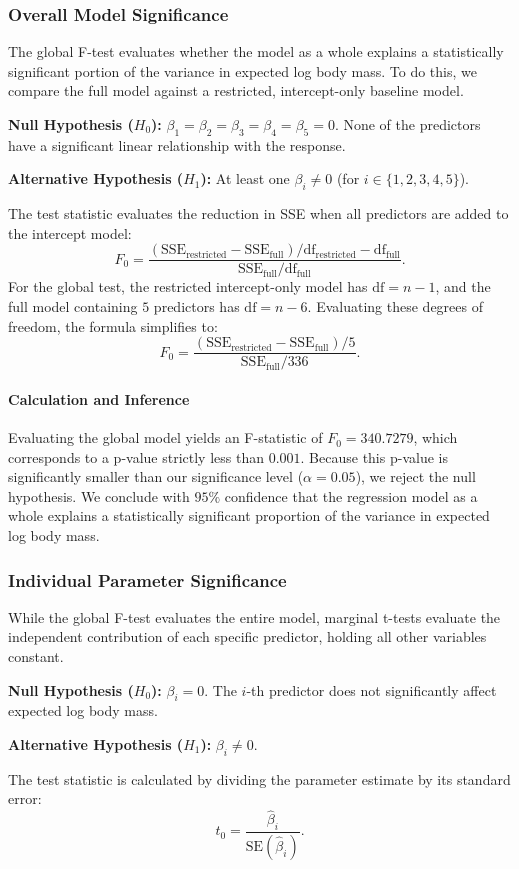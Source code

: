 \documentclass[12pt]{article}
\begin{document}
  \subsubsection{Overall Model Significance}
  The global F-test evaluates whether the model as a whole
  explains a statistically significant portion of the variance
  in expected log body mass. To do this, we compare the full
  model against a restricted, intercept-only baseline model.
  \begin{itemize}
      \ii \textbf{Null Hypothesis ($H_0$):} $\beta_1 = \beta_2 =
      \beta_3 = \beta_4 = \beta_5 = 0$. None of the predictors
      have a significant linear relationship with the response.

      \ii \textbf{Alternative Hypothesis ($H_1$):} At least one
      $\beta_i \neq 0$ (for $i \in \{1,2,3,4,5\}$).
  \end{itemize}
  The test statistic
  evaluates the reduction in SSE when
  all predictors are added to the intercept model:
  \[
    F_0 = \frac{{(\text{SSE}_{\text{restricted}} -
    \text{SSE}_{\text{full}})} / {\mathrm{df}_{\text{restricted}} -
    \mathrm{df}_{\text{full}}}}{\text{SSE}_{\text{full}}
    / \mathrm{df}_{\text{full}}}
    .\]
  For the global test, the restricted intercept-only model
  has $\mathrm{df} = n-1$, and the full model containing $5$ predictors
  has $\mathrm{df} = n-6$. Evaluating these degrees of freedom, the
  formula simplifies to:
  \[
    F_0 = \frac{(\text{SSE}_{\text{restricted}} -
    \text{SSE}_{\text{full}}) / 5}{\text{SSE}_{\text{full}}
    / 336}
    .\]

  \paragraph{Calculation and Inference}
  Evaluating the global model yields an F-statistic of
  $F_0 = 340.7279$, which corresponds to a p-value strictly
  less than $0.001$. Because
  this p-value is significantly smaller than our significance
  level ($\alpha = 0.05$), we reject the null hypothesis. We
  conclude with $95\%$ confidence that the regression model
  as a whole explains a statistically significant proportion
  of the variance in expected log body mass.


  \subsubsection{Individual Parameter Significance}
  While the global F-test evaluates the entire model, marginal
  t-tests evaluate the independent contribution of each
  specific predictor, holding all other variables constant.
  \begin{itemize}
      \ii \textbf{Null Hypothesis ($H_0$):} $\beta_i = 0$. The
      $i$-th predictor does not significantly affect expected
      log body mass.

      \ii \textbf{Alternative Hypothesis ($H_1$):} $\beta_i \neq 0$.
  \end{itemize}
  The test statistic is calculated by dividing the parameter
  estimate by its standard error:
  \[
    t_0 = \frac{\hat{\beta}_i}{\text{SE}(\hat{\beta}_i)}
    .\]
\end{document}
